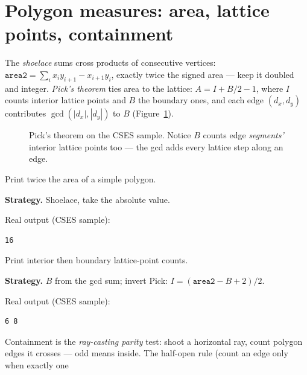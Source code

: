 \section{Polygon measures: area, lattice points, containment}\label{sec:poly}
The \emph{shoelace} sums cross products of consecutive vertices:
$\texttt{area2}=\sum_i x_i y_{i+1}-x_{i+1}y_i$, exactly twice the
signed area --- keep it doubled and integer. \emph{Pick's
theorem} ties area to the lattice:
$A = I + B/2 - 1$, where $I$ counts interior lattice points and
$B$ the boundary ones, and each edge $(d_x,d_y)$ contributes
$\gcd(|d_x|,|d_y|)$ to $B$ (Figure~\ref{fig:pick}).
\begin{figure}[ht]\centering

\caption{Pick's theorem on the CSES sample. Notice $B$ counts
edge \emph{segments'} interior lattice points too --- the gcd
adds every lattice step along an edge.}
\label{fig:pick}
\end{figure}
\begin{example}\label{ex:area}
Print twice the area of a simple polygon.
\par\smallskip
\textbf{Strategy.} Shoelace, take the absolute value.
\par\smallskip
\begin{solution}

Real output (CSES sample):
\begin{lstlisting}[numbers=none]
16
\end{lstlisting}
\end{solution}
\end{example}
\begin{example}\label{ex:pick}
Print interior then boundary lattice-point counts.
\par\smallskip
\textbf{Strategy.} $B$ from the gcd sum; invert Pick:
$I=(\texttt{area2}-B+2)/2$.
\par\smallskip
\begin{solution}

Real output (CSES sample):
\begin{lstlisting}[numbers=none]
6 8
\end{lstlisting}
\end{solution}
\end{example}
Containment is the \emph{ray-casting parity} test: shoot a
horizontal ray, count polygon edges it crosses --- odd means
inside. The half-open rule (count an edge only when exactly one
